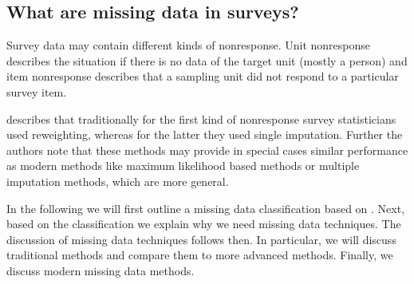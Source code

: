 \subsection{What are missing data in surveys?}

Survey data may contain different kinds of nonresponse. Unit nonresponse describes the situation if there is no data of the target unit (mostly a person) and item nonresponse describes that a sampling unit did not respond to a particular survey item. \par

\cite{schafer2002missing} describes that traditionally for the first kind of nonresponse survey statisticians used reweighting, whereas for the latter they used single imputation.
Further the authors note that these methods may provide in special cases similar performance as modern methods like maximum likelihood based methods or multiple imputation methods, which are more general. \par

In the following we will first outline a missing data classification based on \cite{rubin1976}. 
Next, based on the classification we explain why we need missing data techniques. 
The discussion of missing data techniques follows then. In particular, we will discuss traditional methods and compare them to more advanced methods. 
Finally, we discuss modern missing data methods. \par

